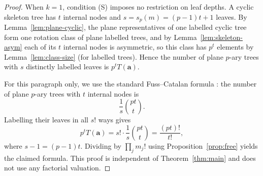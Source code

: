 \documentclass[11pt]{amsart}
\theoremstyle{definition}
\theoremstyle{remark}
\begin{document}
\begin{proof}
When $k=1$, condition (S) imposes no restriction on leaf depths.  A cyclic skeleton tree has $t$ internal nodes and $s=s_p(m)=(p-1)t+1$ leaves.  By Lemma~\ref{lem:plane-cyclic}, the plane representatives of one labelled cyclic tree form one rotation class of plane labelled trees, and by Lemma~\ref{lem:skeleton-asym} each of its $t$ internal nodes is asymmetric, so this class has $p^t$ elements by Lemma~\ref{lem:class-size} (for labelled trees).  Hence the number of plane $p$-ary trees with $s$ distinctly labelled leaves is $p^tT(\mathbf a)$.

For this paragraph only, we use the standard Fuss--Catalan formula \cite{Konvalinka}: the number of plane $p$-ary trees with $t$ internal nodes is
\[
 \frac1s\binom{pt}{t}.
\]
Labelling their leaves in all $s!$ ways gives
\[
 p^tT(\mathbf a)=s!\cdot\frac1s\binom{pt}{t}
 =\frac{(pt)!}{t!},
\]
where $s-1=(p-1)t$.  Dividing by $\prod_jm_j!$ using Proposition~\ref{prop:free} yields the claimed formula.  This proof is independent of Theorem~\ref{thm:main} and does not use any factorial valuation.
\end{proof}
\end{document}

